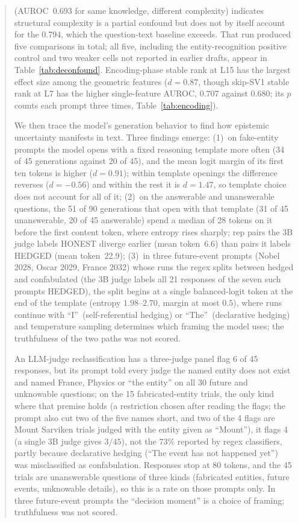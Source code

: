 \documentclass[11pt,a4paper]{article}
\begin{document}
\begin{abstract}
(AUROC~$0.693$ for same knowledge, different complexity) indicates
structural complexity is a partial confound but does not by itself account
for the $0.794$, which the question-text baseline exceeds. That run produced five comparisons in total; all five,
including the entity-recognition positive control and two weaker cells not
reported in earlier drafts, appear in Table~\ref{tab:deconfound}. Encoding-phase stable rank at L15 has the largest effect size among the geometric features ($d=0.87$, though skip-SV1 stable rank at L7 has the higher single-feature AUROC, $0.707$ against $0.680$; its $p$ counts each prompt three times,
Table~\ref{tab:encoding}).

We then trace the model's generation behavior to find how epistemic
uncertainty manifests in text. Three findings emerge: (1)~on fake-entity prompts the model opens with a fixed reasoning
template more often (34 of 45 generations against 20 of 45), and the mean
logit margin of its first ten tokens is higher ($d=0.91$); within template
openings the difference reverses ($d=-0.56$) and within the rest it is
$d=1.47$, so template choice does not account for all of it; (2)~on the
answerable and unanswerable questions, the 51 of 90 generations that open
with that template (31 of 45 unanswerable, 20 of 45 answerable) spend a
median of 28 tokens on it before the first content token, where entropy
rises sharply; rep pairs the 3B judge labels HONEST diverge earlier (mean
token~6.6) than pairs it labels HEDGED (mean token~22.9); (3)~in three
future-event prompts (Nobel 2028, Oscar 2029, France 2032) whose runs the
regex splits between hedged and confabulated (the 3B judge labels all 21
responses of the seven such prompts HEDGED), the split begins at a single
balanced-logit token at the end of the template (entropy $1.98$--$2.70$,
margin at most $0.5$), where runs continue with ``I''\ (self-referential
hedging) or ``The''\ (declarative hedging) and temperature sampling
determines which framing the model uses; the truthfulness of the two paths was not scored.

An LLM-judge reclassification has a three-judge panel flag 6 of 45 responses, but its prompt told every judge the named entity does not exist and named France, Physics or ``the entity'' on all 30 future and unknowable questions; on the 15 fabricated-entity trials, the only kind where that premise holds (a restriction chosen after reading the flags; the prompt also cut two of the five names short, and two of the 4 flags are Mount Sarviken trials judged with the entity given as ``Mount''), it flags 4 (a single 3B judge gives $3/45$), not the $73\%$ reported by regex classifiers, partly because
declarative hedging (``The event has not happened yet'') was misclassified
as confabulation. Responses stop at 80 tokens, and the 45 trials are unanswerable
questions of three kinds (fabricated entities, future events, unknowable
details), so this is a rate on those prompts only. In three future-event prompts the ``decision
moment'' is a choice of framing; truthfulness was not scored.
\end{abstract}
\end{document}
